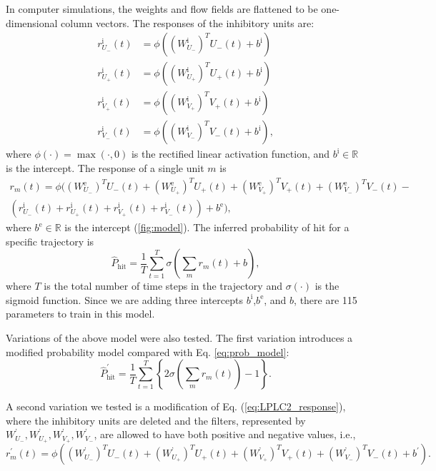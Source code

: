 \documentclass[pdftex,9pt,lineno]{elife}
\let\hat\widehat
\begin{document}
In computer simulations, the weights and flow fields are flattened to be one-dimensional column vectors. The responses of the inhibitory units are:
\begin{align*}
r^{\text{i}}_{U_{-}}(t) &= \phi \left( (W^{\text{i}}_{U_{-}})^{T}U_{-}(t)+b^{\text{i}} \right) \nonumber \\
r^{\text{i}}_{U_{+}}(t) &= \phi \left( (W^{\text{i}}_{U_{+}})^{T}U_{+}(t)+b^{\text{i}} \right) \nonumber \\
r^{\text{i}}_{V_{+}}(t) &= \phi \left( (W^{\text{i}}_{V_{+}})^{T}V_{+}(t)+b^{\text{i}} \right) \nonumber \\
r^{\text{i}}_{V_{-}}(t) &= \phi \left( (W^{\text{i}}_{V_{-}})^{T}V_{-}(t)+b^{\text{i}} \right),
\end{align*}
where $\phi(\cdot) = \max(\cdot,0)$ is the rectified linear activation function, and $b^{\text{i}} \in \mathbb{R}$ is the intercept.
The response of a single unit $m$ is
\begin{multline}\label{eq:LPLC2_response}
r_{m}(t) = \phi \Bigg( (W^{\text{e}}_{U_{-}})^{T}U_{-}(t)+(W^{\text{e}}_{U_{+}})^{T}U_{+}(t)+(W^{\text{e}}_{V_{+}})^{T}V_{+}(t)+(W^{\text{e}}_{V_{-}})^{T}V_{-}(t)- \\
\left(r^{\text{i}}_{U_{-}}(t)+r^{\text{i}}_{U_{+}}(t)+r^{\text{i}}_{V_{+}}(t)+r^{\text{i}}_{V_{-}}(t)\right)+b^{\text{e}} \Bigg),
\end{multline}
where $b^{\text{e}} \in \mathbb{R}$ is the intercept (\ref{fig:model}).
The inferred probability of hit for a specific trajectory is
\begin{equation}
\hat{P}_{\text{hit}} =\frac{1}{T}\sum_{t=1}^{T} \sigma \left( \sum_{m}r_{m}(t)+b \right),
\label{eq:prob_model}
\end{equation}
where $T$ is the total number of time steps in the trajectory and $\sigma(\cdot)$ is the sigmoid function. Since we are adding three intercepts $b^{\text{i}}$,$b^{\text{e}}$, and $b$, there are 115 parameters to train in this model.

Variations of the above model were also tested. The first variation introduces a modified probability model compared with Eq. \ref{eq:prob_model}:
\begin{equation}
\hat{P}^{'}_{\text{hit}} = \frac{1}{T}\sum_{t=1}^{T}\left\{ 2\sigma \left( \sum_{m}r_{m}(t) \right)-1 \right\}.
\label{eq:prob_model2}
\end{equation}

A second variation we tested is a modification of Eq. (\ref{eq:LPLC2_response}), where the inhibitory units are deleted and the filters, represented by $W^{\text{'}}_{U_{-}},W^{\text{'}}_{U_{+}},W^{\text{'}}_{V_{+}},W^{\text{'}}_{V_{-}}$, are allowed to have both positive and negative values, i.e.,
\begin{equation}
r_{m}^{'}(t) = \phi \left( (W^{\text{'}}_{U_{-}})^{T}U_{-}(t)+(W^{\text{'}}_{U_{+}})^{T}U_{+}(t)+(W^{\text{'}}_{V_{+}})^{T}V_{+}(t)+(W^{\text{'}}_{V_{-}})^{T}V_{-}(t)+b^{'} \right).
\label{eq:LPLC2_response_2}
\end{equation}
\end{document}

